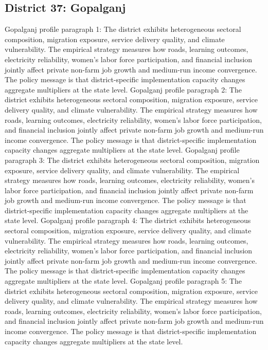\documentclass[preprint,12pt]{elsarticle}
\begin{document}
\subsection{District 37: Gopalganj}
Gopalganj profile paragraph 1: The district exhibits heterogeneous sectoral composition, migration exposure, service delivery quality, and climate vulnerability. The empirical strategy measures how roads, learning outcomes, electricity reliability, women's labor force participation, and financial inclusion jointly affect private non-farm job growth and medium-run income convergence. The policy message is that district-specific implementation capacity changes aggregate multipliers at the state level.
Gopalganj profile paragraph 2: The district exhibits heterogeneous sectoral composition, migration exposure, service delivery quality, and climate vulnerability. The empirical strategy measures how roads, learning outcomes, electricity reliability, women's labor force participation, and financial inclusion jointly affect private non-farm job growth and medium-run income convergence. The policy message is that district-specific implementation capacity changes aggregate multipliers at the state level.
Gopalganj profile paragraph 3: The district exhibits heterogeneous sectoral composition, migration exposure, service delivery quality, and climate vulnerability. The empirical strategy measures how roads, learning outcomes, electricity reliability, women's labor force participation, and financial inclusion jointly affect private non-farm job growth and medium-run income convergence. The policy message is that district-specific implementation capacity changes aggregate multipliers at the state level.
Gopalganj profile paragraph 4: The district exhibits heterogeneous sectoral composition, migration exposure, service delivery quality, and climate vulnerability. The empirical strategy measures how roads, learning outcomes, electricity reliability, women's labor force participation, and financial inclusion jointly affect private non-farm job growth and medium-run income convergence. The policy message is that district-specific implementation capacity changes aggregate multipliers at the state level.
Gopalganj profile paragraph 5: The district exhibits heterogeneous sectoral composition, migration exposure, service delivery quality, and climate vulnerability. The empirical strategy measures how roads, learning outcomes, electricity reliability, women's labor force participation, and financial inclusion jointly affect private non-farm job growth and medium-run income convergence. The policy message is that district-specific implementation capacity changes aggregate multipliers at the state level.
\end{document}
